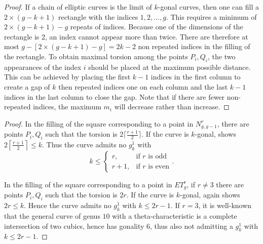 \documentclass[11pt]{amsart}
\newcommand{\g}[2]{g^{#1}_{#2}}
\newcommand{\ceil}[1]{\left\lceil #1 \right\rceil}
\newtheorem{lemma}[theorem]{Lemma}
\theoremstyle{definition}
\theoremstyle{definition}
\begin{document}
\begin{proof} If a chain of elliptic curves is the limit of $k$-gonal curves, then one can fill a $2\times (g-k+1)$ rectangle with the indices $1,2,\dots, g$.
	This requires a minimum of $2\times (g-k+1)-g$ repeats of indices. 
	Because one of the dimensions of the rectangle is 2, an index cannot appear more than twice.
	There are therefore at most $g-[2\times (g-k+1)-g]=2k-2$ non repeated indices in the filling of the rectangle.
	To obtain maximal torsion among the points $P_i, Q_i$, the two appearances of the index $i$ should be placed at the maximum possible distance.
	This can be achieved by placing the first $k-1$ indices in the first column to create a gap of $k$ then repeated indices one on each column and the last $k-1$ indices in the last column to close the gap.
	Note that if there are fewer non-repeated indices, the maximum $m_i$ will decrease rather than increase.
\end{proof}

\begin{proof} In the filling of the square corresponding to a point in $N^r_{g,g-1}$, there are points $P_i, Q_i$ such that the torsion is $2\lceil{\frac {r+1}2}\rceil$. 
If the curve is $k$-gonal,  shows $2\ceil{\frac{r+1}{2}}\leq k$.
 Thus the curve admits no $\g{1}{k}$ with 	\[k\leq \begin{cases}	r, & \text{if $r$ is odd} \\		r+1, & \text{if $r$ is even}	\end{cases}.\]
		
In the filling of the square corresponding to a point in $ET^r_{g}$, if $r\neq 3$ there are points $P_i, Q_i$ such that the torsion is $2r$.
 If the curve is $k$-gonal,  again shows $2r\le k$. 
 Hence the curve admits no $\g{1}{k}$ with $k\leq 2r-1$.
  If $r=3$, it is well-known that the general curve of genus $10$ with a theta-characteristic is a complete intersection of two cubics, hence has gonality $6$, thus also not admitting a $\g{1}{k}$ with $k\leq 2r-1$.
\end{proof}
\end{document}
